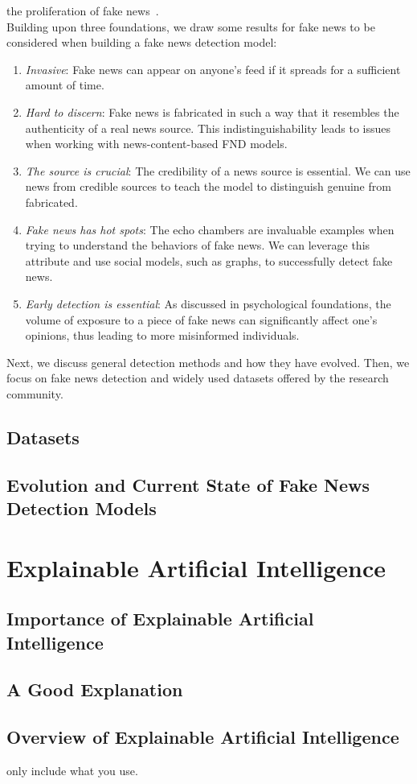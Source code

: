 the proliferation of fake news~\parencite{AnyoneCanBecomeATroll_Cheng}.\\
Building upon three foundations, we draw some results for fake news to be considered when building a fake news detection model:
\begin{enumerate}
    \item \emph{Invasive}: Fake news can appear on anyone’s feed if it spreads for a sufficient amount of time.
    \item \emph{Hard to discern}: Fake news is fabricated in such a way that it resembles the authenticity of a real news source. This
          indistinguishability leads to issues when working with news-content-based FND models.
    \item \emph{The source is crucial}: The credibility of a news source is essential. We can use news from credible sources to teach the model
          to distinguish genuine from fabricated.
    \item \emph{Fake news has hot spots}: The echo chambers are invaluable examples when trying to understand the behaviors of fake news. We can
          leverage this attribute and use social models, such as graphs, to successfully detect fake news.
    \item \emph{Early detection is essential}: As discussed in psychological foundations, the volume of exposure to a piece of fake news can significantly affect one’s opinions, thus leading to more misinformed individuals.
\end{enumerate}
Next, we discuss general detection methods and how they have evolved. Then, we focus on fake news detection and widely used datasets offered
by the research community.


\subsection{Datasets}
\label{subsec:fakeNewsDetection_Datasets}

\subsection{Evolution and Current State of Fake News Detection Models}
\label{subsec:fakeNewsDetection_Evolution}

\section{Explainable Artificial Intelligence}
\label{sec:explainableArtificialIntelligence}

\subsection{Importance of Explainable Artificial Intelligence}

\subsection{A Good Explanation}

\subsection{Overview of Explainable Artificial Intelligence}
only include what you use.
